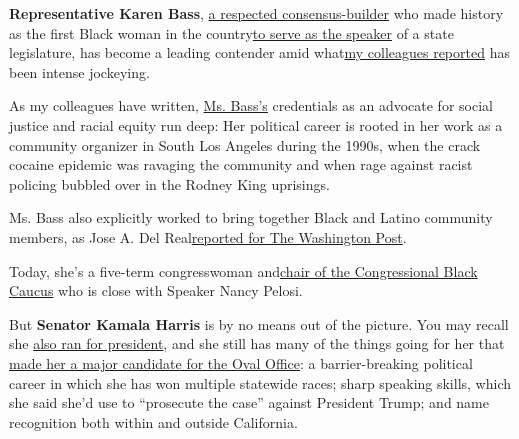 \textbf{Representative Karen Bass},
\href{https://www.nytimes3xbfgragh.onion/2020/06/10/us/politics/karen-bass.html}{a
respected consensus-builder} who made history as the first Black woman
in the
country\href{https://www.washingtonpost.com/politics/rep-karen-bass-fought-for-blacks-and-latinos-in-south-los-angeles-now-shes-on-bidens-vp-shortlist/2020/07/31/6d224a58-d1d3-11ea-8c55-61e7fa5e82ab_story.html?hpid=hp_hp-more-top-stories-2_vpkarenbass-1135am\%3Ahomepage\%2Fstory-ans}{to
serve as the speaker} of a state legislature, has become a leading
contender amid
what\href{https://www.nytimes3xbfgragh.onion/2020/07/31/us/politics/joseph-biden-vice-president.html}{my
colleagues reported} has been intense jockeying.

As my colleagues have written,
\href{https://www.nytimes3xbfgragh.onion/2020/08/04/us/politics/karen-bass-vice-president-biden.html}{Ms.
Bass's} credentials as an advocate for social justice and racial equity
run deep: Her political career is rooted in her work as a community
organizer in South Los Angeles during the 1990s, when the crack cocaine
epidemic was ravaging the community and when rage against racist
policing bubbled over in the Rodney King uprisings.

Ms. Bass also explicitly worked to bring together Black and Latino
community members, as Jose A. Del
Real\href{https://www.washingtonpost.com/politics/rep-karen-bass-fought-for-blacks-and-latinos-in-south-los-angeles-now-shes-on-bidens-vp-shortlist/2020/07/31/6d224a58-d1d3-11ea-8c55-61e7fa5e82ab_story.html?hpid=hp_hp-more-top-stories-2_vpkarenbass-1135am\%3Ahomepage\%2Fstory-ans}{reported
for The Washington Post}.

Today, she's a five-term congresswoman
and\href{https://cbc.house.gov/about/about-the-chair.htm}{chair of the
Congressional Black Caucus} who is close with Speaker Nancy Pelosi.

But \textbf{Senator Kamala Harris} is by no means out of the picture.
You may recall she
\href{https://www.nytimes3xbfgragh.onion/2019/12/04/us/kamala-harris-drops-out.html}{also
ran for president}, and she still has many of the things going for her
that
\href{https://www.nytimes3xbfgragh.onion/interactive/2020/us/elections/kamala-harris.html}{made
her a major candidate for the Oval Office}: a barrier-breaking political
career in which she has won multiple statewide races; sharp speaking
skills, which she said she'd use to ``prosecute the case'' against
President Trump; and name recognition both within and outside
California.


